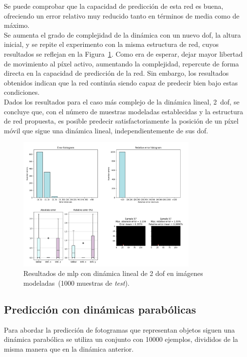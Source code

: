 Se puede comprobar que la capacidad de predicción de esta red es buena, ofreciendo un error relativo muy reducido tanto en términos de media como de máximo.\\

Se aumenta el grado de complejidad de la dinámica con un nuevo \acrshort{dof}, la altura inicial, y se repite el experimento con la misma estructura de red, cuyos resultados se reflejan en la Figura~\ref{fig.norec_lin_var_10000}. Como era de esperar, dejar mayor libertad de movimiento al píxel activo, aumentando la complejidad, repercute de forma directa en la capacidad de predicción de la red. Sin embargo, los resultados obtenidos indican que la red continúa siendo capaz de predecir bien bajo estas condiciones.\\

Dados los resultados para el caso más complejo de la dinámica lineal, 2~\acrshort{dof}, se concluye que, con el número de muestras modeladas establecidas y la estructura de red propuesta, es posible predecir satisfactoriamente la posición de un píxel móvil que sigue una dinámica lineal, independientemente de sus \acrshort{dof}.

\begin{figure}[H]
		\begin{center}
			\includegraphics[width=0.8\textwidth]{ figures/test_mod/NOREC/linear_var_10000.png}
			\caption{Resultados de \acrshort{mlp} con dinámica lineal de 2 \acrshort{dof} en imágenes modeladas~(1000 muestras de \textit{test}).}
			\label{fig.norec_lin_var_10000}
		\end{center}
\end{figure}
\vspace{-10pt}


\subsection{Predicción con dinámicas parabólicas}
Para abordar la predicción de fotogramas que representan objetos siguen una dinámica parabólica se utiliza un conjunto con 10000 ejemplos, divididos de la misma manera que en la dinámica anterior.\\

